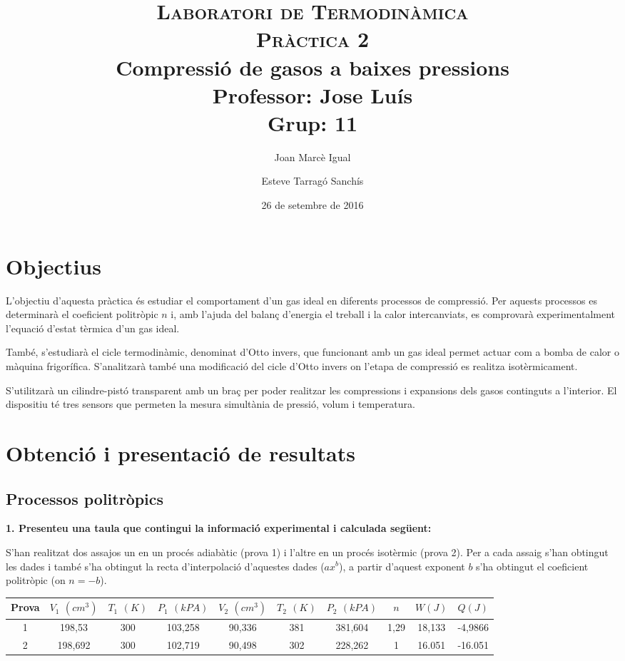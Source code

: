 \documentclass[a4paper]{article}
\title{
    \textsc{Laboratori de Termodinàmica} \\
    \textsc{Pràctica 2} \\
    Compressió de gasos a baixes pressions \\
    \large
    Professor: Jose Luís \\ Grup: 11 }
\author{Joan Marcè Igual \and Esteve Tarragó Sanchís}
\date{26 de setembre de 2016}
\begin{document}
\maketitle

\section*{Objectius}

L'objectiu d'aquesta pràctica és estudiar el comportament d'un gas ideal en diferents processos de compressió. Per aquests processos es determinarà el coeficient politròpic $n$ i, amb l'ajuda del balanç d'energia el treball i la calor intercanviats, es comprovarà experimentalment l'equació d'estat tèrmica d'un gas ideal. 

També, s'estudiarà el cicle termodinàmic, denominat d'Otto invers, que funcionant amb un gas ideal permet actuar com a bomba de calor o màquina frigorífica. S'analitzarà també una modificació del cicle d'Otto invers on l'etapa de compressió es realitza isotèrmicament.

S'utilitzarà un cilindre-pistó transparent amb un braç per poder realitzar les compressions i expansions dels gasos continguts a l'interior. El dispositiu té tres sensors que permeten la mesura simultània de pressió, volum i temperatura.

\section*{Obtenció i presentació de resultats}

\subsection*{Processos politròpics}

\textbf{1. Presenteu una taula que contingui la informació experimental i calculada següent:}

S'han realitzat dos assajos un en un procés adiabàtic (prova 1) i l'altre en un procés isotèrmic (prova 2). Per a cada assaig s'han obtingut les dades i també s'ha obtingut la recta d'interpolació d'aquestes dades ($ax^b$), a partir d'aquest exponent $b$ s'ha obtingut el coeficient politròpic (on $n = -b$).
\begin{center}
\begin{tabular}{c|ccccccccc}
    Prova & $V_1$ $(cm^3)$ & $T_1$ $(K)$ & $P_1$ $(kPA)$ & $V_2$ $(cm^3)$ & $T_2$ $(K)$ & $P_2$ $(kPA)$ & $n$ & $W(J)$ & $Q(J)$ \\
    \hline
    1 & 198,53 & 300 & 103,258 & 90,336 & 381 & 381,604 & 1,29 & 18,133 & -4,9866 \\
    2 & 198,692 & 300 & 102,719 & 90,498 & 302 & 228,262 & 1 & 16.051 & -16.051
\end{tabular}
\end{center}
\end{document}
